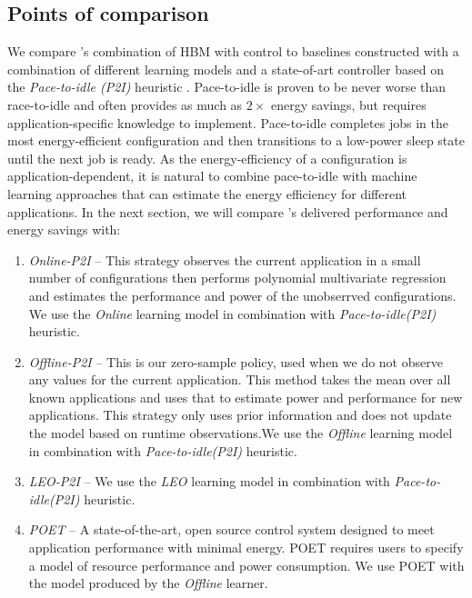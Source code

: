 \subsection{Points of comparison}
We compare \SYSTEM{}'s combination of HBM with control to baselines
constructed with a combination of different learning models and a
state-of-art controller based on the \emph{Pace-to-idle (P2I)}
heuristic \cite{kim-cpsna}.  Pace-to-idle is proven to be never worse
than race-to-idle and often provides as much as $2\times$ energy
savings, but requires application-specific knowledge to implement.
Pace-to-idle completes jobs in the most energy-efficient configuration
and then transitions to a low-power sleep state until the next job is
ready.  As the energy-efficiency of a configuration is
application-dependent, it is natural to combine pace-to-idle with
machine learning approaches that can estimate the energy efficiency
for different applications.  In the next section, we will compare
\SYSTEM{}'s delivered performance and energy savings with:
\begin{enumerate}
\item \textit{Online-P2I} -- This strategy observes the current
  application in a small number of configurations then performs
  polynomial multivariate regression and estimates the performance and
  power of the unobserrved configurations. We use the \textit{Online} learning model
  in combination with \emph{Pace-to-idle(P2I)} heuristic.
\item \textit{Offline-P2I} -- This is our zero-sample policy, used when we
  do not observe any values for the current application. This method
  takes the mean over all known applications and uses that to estimate
  power and performance for new applications.  This strategy only uses
  prior information and does not update the model based on runtime
  observations.We use the \textit{Offline} learning
  model in combination with \emph{Pace-to-idle(P2I)} heuristic.
\item \textit{LEO-P2I} -- We use the \textit{LEO} learning model in
  combination with \emph{Pace-to-idle(P2I)} heuristic.
\item \textit{POET} -- A state-of-the-art, open source control system
  designed to meet application performance with minimal energy.  POET
  requires users to specify a model of resource performance and power
  consumption.  We use POET with the model produced by the
  \emph{Offline} learner.
\end{enumerate}

